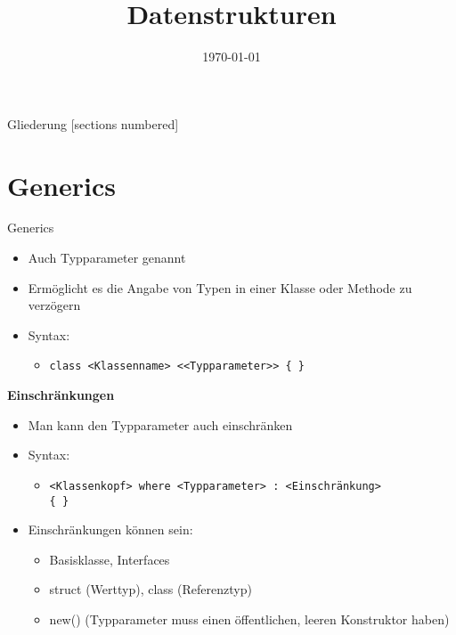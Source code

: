 



\title{Datenstrukturen}
\date{\today}




\maketitle

\begin{frame}{Gliederung}
	[sections numbered]
	\tableofcontents
\end{frame}

\section{Generics}
\begin{frame}{Generics}
	\begin{itemize}
		\item Auch Typparameter genannt
		\item Ermöglicht es die Angabe von Typen in einer Klasse oder Methode zu verzögern
		\item Syntax:
		\begin{itemize}
			\item \texttt{class \alert{<Klassenname>} <\alert{<Typparameter>}> \{ \}}
		\end{itemize}
	\end{itemize}
	\textbf{Einschränkungen}\\
	\begin{itemize}
		\item Man kann den Typparameter auch einschränken
		\item Syntax:
		\begin{itemize}
			\item \texttt{\alert{<Klassenkopf>} where \alert{<Typparameter>} : \alert{<Einschränkung>}\\ \{ \}}
		\end{itemize}
		\item Einschränkungen können sein:
		\begin{itemize}
			\item Basisklasse, Interfaces
			\item \alert{struct} (Werttyp), \alert{class} (Referenztyp)
			\item \alert{new()} (Typparameter muss einen öffentlichen, leeren Konstruktor haben)
		\end{itemize}
	\end{itemize}
\end{frame}

